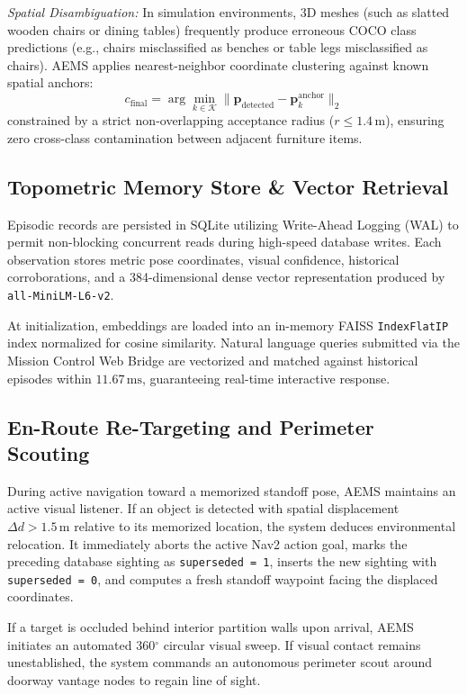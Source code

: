 \documentclass[conference]{IEEEtran}
\begin{document}
\textit{Spatial Disambiguation:} In simulation environments, 3D meshes (such as slatted wooden chairs or dining tables) frequently produce erroneous COCO class predictions (e.g., chairs misclassified as benches or table legs misclassified as chairs). AEMS applies nearest-neighbor coordinate clustering against known spatial anchors:
\begin{equation}
c_{\text{final}} = \arg\min_{k \in \mathcal{K}} \|\mathbf{p}_{\text{detected}} - \mathbf{p}_k^{\text{anchor}}\|_2
\end{equation}
constrained by a strict non-overlapping acceptance radius ($r \le 1.4\,\text{m}$), ensuring zero cross-class contamination between adjacent furniture items.

\subsection{Topometric Memory Store \& Vector Retrieval}
Episodic records are persisted in SQLite utilizing Write-Ahead Logging (WAL) to permit non-blocking concurrent reads during high-speed database writes. Each observation stores metric pose coordinates, visual confidence, historical corroborations, and a 384-dimensional dense vector representation produced by \texttt{all-MiniLM-L6-v2}. 

At initialization, embeddings are loaded into an in-memory FAISS \texttt{IndexFlatIP} index normalized for cosine similarity. Natural language queries submitted via the Mission Control Web Bridge are vectorized and matched against historical episodes within $11.67\,\text{ms}$, guaranteeing real-time interactive response.

\subsection{En-Route Re-Targeting and Perimeter Scouting}
During active navigation toward a memorized standoff pose, AEMS maintains an active visual listener. If an object is detected with spatial displacement $\Delta d > 1.5\,\text{m}$ relative to its memorized location, the system deduces environmental relocation. It immediately aborts the active Nav2 action goal, marks the preceding database sighting as \texttt{superseded = 1}, inserts the new sighting with \texttt{superseded = 0}, and computes a fresh standoff waypoint facing the displaced coordinates.

If a target is occluded behind interior partition walls upon arrival, AEMS initiates an automated 360$^\circ$ circular visual sweep. If visual contact remains unestablished, the system commands an autonomous perimeter scout around doorway vantage nodes to regain line of sight.
\end{document}
